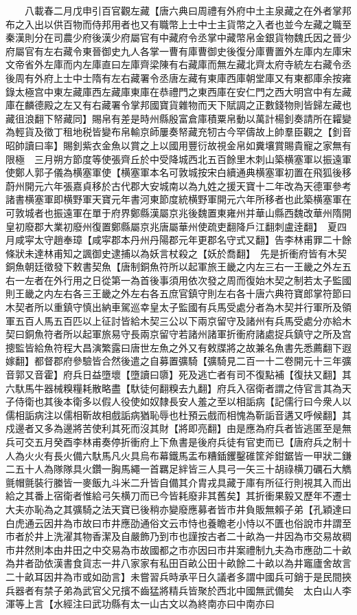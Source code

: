 　　八載春二月戊申引百官觀左藏【唐六典曰周禮有外府中土主泉藏之在外者掌邦布之入出以供百物而侍邦用者也又有職幣上士中士主貨幣之入者也並今左藏之職至秦漢則分在司農少府後漢少府屬官有中藏府令丞掌中藏幣帛金銀貨物魏氏因之晉少府屬官有左右藏令東晉御史九人各掌一曹有庫曹御史後復分庫曹置外左庫内左庫宋文帝省外左庫而内左庫直曰左庫齊梁陳有右藏庫而無左藏北齊太府寺統左右藏令丞後周有外府上士中士隋有左右藏署令丞唐左藏有東庫西庫朝堂庫又有東都庫余按雍錄太極宫中東左藏庫西左藏庫東庫在恭禮門之東西庫在安仁門之西大明宫中有左藏庫在麟德殿之左又有右藏署令掌邦國寶貨雜物而天下賦調之正數錢物則皆歸左藏也藏徂浪翻下帑藏同】賜帛有差是時州縣殷富倉庫積粟帛動以萬計楊釗奏請所在糶變為輕貨及徵丁租地税皆變布帛輸京師屢奏帑藏充牣古今罕儔故上帥羣臣觀之【釗音昭帥讀曰率】賜釗紫衣金魚以賞之上以國用豐衍故視金帛如糞壤賞賜貴寵之家無有限極　三月朔方節度等使張齊丘於中受降城西北五百餘里木刺山築横塞軍以振遠軍使鄭人郭子儀為横塞軍使【横塞軍本名可敦城按宋白續通典横塞軍初置在飛狐後移蔚州開元六年張嘉貞移於古代郡大安城南以為九姓之援天寶十二年改為天德軍參考諸書横塞軍即横野軍天寶元年書河東節度統横野軍開元六年所移者也此築横塞軍在可敦城者也振遠軍在單于府界鄭縣漢屬京兆後魏置東雍州并華山縣西魏改華州隋開皇初廢郡大業初廢州復置鄭縣屬京兆唐屬華州使疏吏翻降戶江翻刺盧逹翻】　夏四月咸寜太守趙奉璋【咸寜郡本丹州丹陽郡元年更郡名守式又翻】告李林甫罪二十餘條狀未達林甫知之諷御史逮捕以為妖言杖殺之【妖於喬翻】　先是折衝府皆有木契銅魚朝廷徵發下敕書契魚【唐制銅魚符所以起軍旅王畿之内左三右一王畿之外左五右一左者在外行用之日從第一為首後事須用依次發之周而復始木契之制若太子監國則王畿之内左右各三王畿之外左右各五庶官鎮守則左右各十唐六典符寶郎掌符節曰木契者所以重鎮守慎出納車駕巡幸皇太子監國有兵馬受處分者為木契并行軍所及領軍五百人馬五百匹以上征討皆給木契三公以下兩京留守及諸州有兵馬受處分亦給木契曰銅魚符者所以起軍旅易守長兩京留守若諸州諸軍折衝府諸處捉兵鎮守之所及宫摠監皆給魚符程大昌演繁露曰唐世左魚之外又有敕牒將之故兼名魚書先悉薦翻下遐嫁翻】都督郡府參驗皆合然後遣之自募置彍騎【彍騎見二百一十二卷開元十三年彍音郭又音霍】府兵日益墮壞【墮讀曰隳】死及逃亡者有司不復點補【復扶又翻】其六馱馬牛器械糗糧耗散略盡【馱徒何翻糗去九翻】府兵入宿衛者謂之侍官言其為天子侍衛也其後本衛多以假人役使如奴隸長安人羞之至以相詬病【記儒行曰今衆人以儒相詬病注以儒相靳故相戲詬病猶恥辱也杜預云戲而相愧為靳詬音遘又呼候翻】其戍邊者又多為邊將苦使利其死而沒其財【將即亮翻】由是應為府兵者皆逃匿至是無兵可交五月癸酉李林甫奏停折衝府上下魚書是後府兵徒有官吏而已【唐府兵之制十人為火火有長火備六馱馬凡火具烏布幕鐵馬盂布糟鍤钁鑿碓筐斧鉗鋸皆一甲狀二鎌二五十人為隊隊具火鑽一胸馬繩一首羈足絆皆三人具弓一矢三十胡祿横刀礪石大觹氈帽氈裝行縢皆一麥飯九斗米二升皆自備其介胄戎具藏于庫有所征行則視其入而出給之其番上宿衛者惟給弓矢横刀而已今皆耗廢非其舊矣】其折衝果毅又歷年不遷士大夫亦恥為之其彍騎之法天寶已後稍亦變廢應募者皆市井負販無賴子弟【孔穎達曰白虎通云因井為市故曰市井應劭通俗文云市恃也養瞻老小恃以不匱也俗說市井謂至市者於井上洗濯其物香潔及自嚴飾乃到市也謹按古者二十畝為一井因為市交易故稠市井然則本由井田之中交易為市故國都之市亦因曰市井案禮制九夫為市應劭二十畝為井者劭依漢書食貨志一井八家家有私田百畝公田十畝餘二十畝以為井竈廬舍故言二十畝耳因井為市或如劭言】未嘗習兵時承平日久議者多謂中國兵可銷于是民間挾兵器者有禁子弟為武官父兄擯不齒猛將精兵皆聚於西北中國無武備矣　太白山人李渾等上言【水經注曰武功縣有太一山古文以為終南亦曰中南亦曰